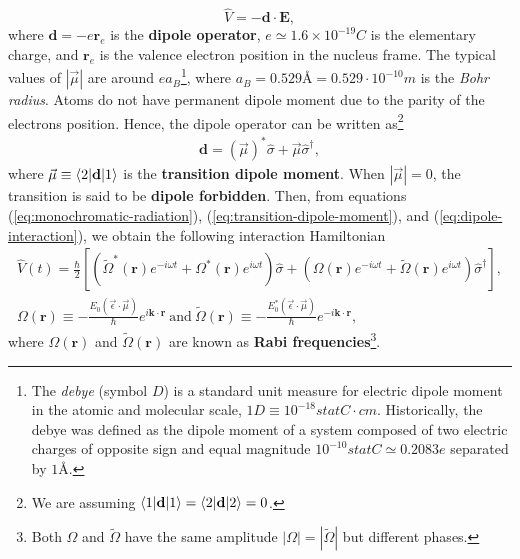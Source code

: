 \begin{equation}
	\hat{V} = - \mathbf{d} \cdot \mathbf{E},
	\label{eq:dipole-interaction}
\end{equation}
where $ \mathbf{d} = - e \mathbf{r}_e  $ is the \textbf{dipole operator}, $ e \simeq 1.6 \times 10^{-19}C $ is the elementary charge, and $ \mathbf{r}_e $ is the valence electron position in the nucleus frame. The typical values of $ |\vec{\mu}| $ are around $ ea_B $\footnote{The \textit{debye} (symbol $ D $) is a standard unit measure for electric dipole moment in the atomic and molecular scale, $ 1 D \equiv 10^{-18} statC \cdot cm $. Historically, the debye was defined as the dipole moment of a system composed of two electric charges of opposite sign and equal magnitude $ 10^{-10} statC \simeq 0.2083 e $ separated by $ 1 \textrm{\AA} $.}, where $ a_B = 0.529 \textrm{\AA} = 0.529 \cdot 10^{-10}m $ is the \textit{Bohr radius}. Atoms do not have permanent dipole moment due to the parity of the electrons position. Hence, the dipole operator can be written as\footnote{We are assuming $ \braket{1|\mathbf{d}|1} = \braket{2|\mathbf{d}|2} = 0 $.}
\begin{gather}
	\mathbf{d} = (\vec{\mu})^* \hat{\sigma} + \vec{\mu} \hat{\sigma}^{\dagger},
	\label{eq:transition-dipole-moment}
\end{gather}
where $ \vec{\mu} \equiv \braket{2|\mathbf{d}|1} $ is the \textbf{transition dipole moment}. When $ |\vec{\mu}| = 0 $, the transition is said to be \textbf{dipole forbidden}. Then, from equations (\ref{eq:monochromatic-radiation}), (\ref{eq:transition-dipole-moment}), and (\ref{eq:dipole-interaction}), we obtain the following interaction Hamiltonian
\begin{gather}
	\hat{V}(t) = \frac{\hbar}{2} [(\tilde{\Omega}^*(\mathbf{r}) e^{- i \omega t} + \Omega^{*}(\mathbf{r})e^{i \omega t})\hat{\sigma} + (\Omega(\mathbf{r}) e^{- i \omega t} + \tilde{\Omega}(\mathbf{r})e^{i \omega t})\hat{\sigma}^{\dagger}],
	\label{eq:full-interaction-Hamiltonian}
	\\
	\Omega(\mathbf{r}) \equiv -\frac{E_0(\vec{\epsilon} \cdot \vec{\mu})}{\hbar}e^{i\mathbf{k}\cdot\mathbf{r}}\ \textrm{and}\ \tilde{\Omega}(\mathbf{r}) \equiv -\frac{E_0^* (\vec{\epsilon} \cdot \vec{\mu})}{\hbar}e^{-i\mathbf{k}\cdot\mathbf{r}},
	\label{eq:Rabi-frequency}
\end{gather}
where $ \Omega(\mathbf{r}) $ and $ \tilde{\Omega}(\mathbf{r}) $ are known as \textbf{Rabi frequencies}\footnote{Both $ \Omega $ and $ \tilde{\Omega} $ have the same amplitude $ |\Omega| = |\tilde{\Omega}| $ but different phases.}.

